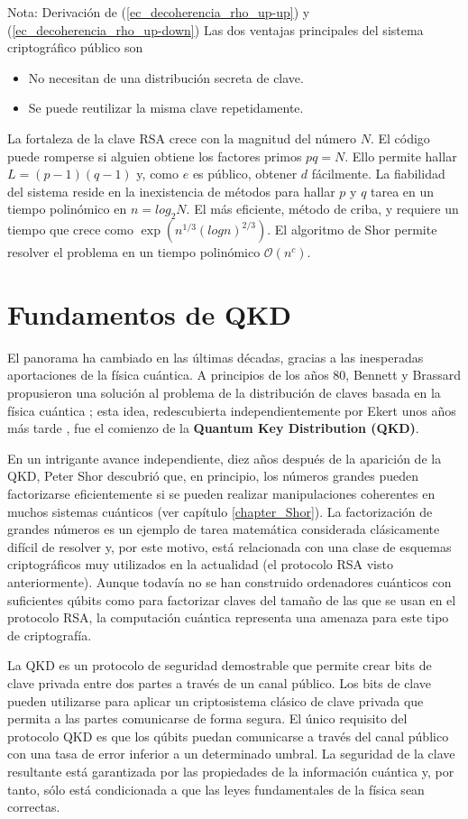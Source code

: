 \documentclass[a4paper,11pt]{book} %
\numberwithin{equation}{chapter}
\begin{document}
\begin{mybox_blue}{Nota: Derivación de (\ref{ec_decoherencia_rho_up-up}) y  (\ref{ec_decoherencia_rho_up-down})}
Las dos ventajas principales del sistema criptográfico público son
\begin{itemize}
	\item No necesitan de una distribución secreta de clave.
	\item Se puede reutilizar la misma clave repetidamente.
\end{itemize}
La fortaleza de la clave RSA crece con la magnitud del número $N$. El código puede romperse si alguien obtiene los factores primos $pq = N$. Ello permite hallar $L = (p - 1)(q - 1)$ y, como $e$ es público, obtener
$d$ fácilmente. La fiabilidad del sistema reside en la inexistencia de métodos para hallar $p$ y $q$ tarea en un tiempo polinómico en $n = log_2 N$. El más eficiente, método de criba, y requiere un tiempo que crece como $\exp( n^{1/3} (log n)^{2/3})$. El algoritmo de Shor permite resolver el problema en un tiempo polinómico $\mathcal{O}(n^c)$. 



	\section{Fundamentos de QKD}


El panorama ha cambiado en las últimas décadas, gracias a las inesperadas aportaciones de la física cuántica. A principios de los años 80, Bennett y Brassard propusieron una solución al problema de la distribución de claves basada en la física cuántica \cite{BB84}; esta idea, redescubierta independientemente por Ekert unos años más tarde \cite{Ekert-1991}, fue el comienzo de la \textbf{Quantum Key Distribution (QKD)}.

En un intrigante avance independiente, diez años después de la aparición de la QKD, Peter Shor descubrió que, en principio, los números grandes pueden factorizarse eficientemente si se pueden realizar manipulaciones coherentes en muchos sistemas cuánticos (ver capítulo \ref{chapter_Shor}). La factorización de grandes números es un ejemplo de tarea matemática considerada clásicamente difícil de resolver y, por este motivo, está relacionada con una clase de esquemas criptográficos muy utilizados en la actualidad (el protocolo RSA visto anteriormente). Aunque todavía no se han construido ordenadores cuánticos con suficientes qúbits como para factorizar claves del tamaño de las que se usan en el protocolo RSA, la computación cuántica representa una amenaza para este tipo de criptografía. 


	La QKD es un protocolo de seguridad demostrable que permite crear bits de clave privada entre dos partes a través de un canal público. Los bits de clave pueden utilizarse para aplicar un criptosistema clásico de clave privada que permita a las partes comunicarse de forma segura. El único requisito del protocolo QKD es que los qúbits puedan comunicarse a través del canal público con una tasa de error inferior a un determinado umbral. La seguridad de la clave resultante está garantizada por las propiedades de la información cuántica y, por tanto, sólo está condicionada a que las leyes fundamentales de la física sean correctas. 


\end{mybox_blue}
\end{document}
